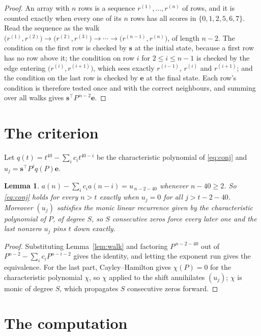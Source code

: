 \documentclass[11pt,a4paper]{article}
\theoremstyle{plain}
\newtheorem{lemma}[theorem]{Lemma}
\theoremstyle{definition}
\begin{document}
\begin{proof}
An array with $n$ rows is a sequence $r^{(1)},\dots,r^{(n)}$ of rows, and it is counted
exactly when every one of its $n$ rows has all scores in $\{0,1,2,5,6,7\}$. Read the sequence as the
walk $\bigl(r^{(1)},r^{(2)}\bigr)\to\bigl(r^{(2)},r^{(3)}\bigr)\to\cdots\to
\bigl(r^{(n-1)},r^{(n)}\bigr)$, of length $n-2$. The condition on the first row is
checked by $\mathbf{s}$ at the initial state, because a first row has no row above it; the
condition on row $i$ for $2\le i\le n-1$ is checked by the edge entering
$\bigl(r^{(i)},r^{(i+1)}\bigr)$, which sees exactly $r^{(i-1)}$, $r^{(i)}$ and
$r^{(i+1)}$; and the condition on the last row is checked by $\mathbf{e}$ at the final
state. Each row's condition is therefore tested once and with the correct neighbours, and
summing over all walks gives $\mathbf{s}^{\!\top}P^{\,n-2}\mathbf{e}$.
\end{proof}

\section{The criterion}

Let $q(t)=t^{40}-\sum_i c_i t^{40-i}$ be the characteristic polynomial of
\eqref{eq:conj} and $u_j=\mathbf{s}^{\!\top}P^{j}q(P)\mathbf{e}$.

\begin{lemma}\label{lem:crit}
$a(n)-\sum_i c_i a(n-i)=u_{\,n-2-40}$ whenever $n-40\ge2$. So \eqref{eq:conj}
holds for every $n>t$ exactly when $u_j=0$ for all $j>t-2-40$. Moreover $(u_j)$
satisfies the monic linear recurrence given by the characteristic polynomial of $P$, of
degree $S$, so $S$ consecutive zeros force every later one and the last nonzero $u_j$ pins
$t$ down exactly.
\end{lemma}

\begin{proof}
Substituting Lemma~\ref{lem:walk} and factoring $P^{\,n-2-40}$ out of
$P^{n-2}-\sum_i c_i P^{n-i-2}$ gives the identity, and letting the exponent run gives the
equivalence. For the last part, Cayley--Hamilton gives $\chi(P)=0$ for the characteristic
polynomial $\chi$, so $\chi$ applied to the shift annihilates $(u_j)$; $\chi$ is monic of
degree $S$, which propagates $S$ consecutive zeros forward.
\end{proof}

\section{The computation}
\end{document}
